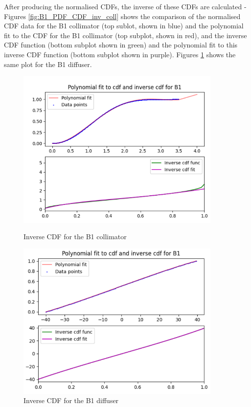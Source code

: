After producing the normalised CDFs, the inverse of these CDFs are calculated - Figures \ref{fig:B1_PDF_CDF_inv_coll} shows the comparison of the normalised CDF data for the B1 collimator (top sublot, shown in blue) and the polynomial fit to the CDF for the B1 collimator (top subplot, shown in red), and the inverse CDF function (bottom subplot shown in green) and the polynomial fit to this inverse CDF function (bottom subplot shown in purple). Figures \ref{fig:B1_PDF_CDF_inv_diff} shows the same plot for the B1 diffuser. 

\begin{figure}
    \centering
    \begin{minipage}{0.45\textwidth}
        \centering
        \includegraphics[width=0.9\textwidth]{Figures/B1_inv_coll_cdf.png} %
        \caption{Inverse CDF for the B1 collimator}
        \label{fig:B1_PDF_CDF_inv_coll}
    \end{minipage}\hfill
    \begin{minipage}{0.45\textwidth}
        \centering
        \includegraphics[width=0.9\textwidth]{Figures/B1_inv_diff_cdf.png} %
        \caption{Inverse CDF for the B1 diffuser}
        \label{fig:B1_PDF_CDF_inv_diff}
    \end{minipage}
\end{figure}


